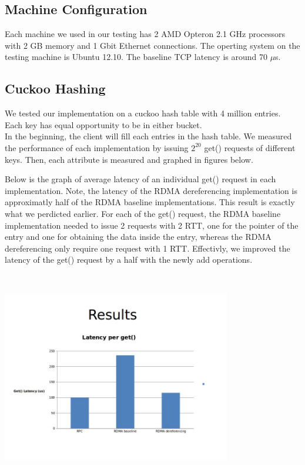 \documentclass[a4paper, oneside, 10pt]{article}
\begin{document}
\subsection{Machine Configuration}
Each machine we used in our testing has 2 AMD Opteron 2.1 GHz processors with 2
GB memory and 1 Gbit Ethernet connections. The operting system on the testing
machine is Ubuntu 12.10. The baseline TCP latency is around 70 $\mu$s.

\subsection{Cuckoo Hashing}
We tested our implementation on a cuckoo hash table with 4 million entries. Each
key has equal opportunity to be in either bucket.\\

In the beginning, the client will fill each entries in the hash table. We
measured the performance of each implementation by issuing $2^{20}$ get()
requests of different keys. Then, each attribute is measured and graphed in
figures below.

Below is the graph of average latency of an individual get() request in each
implementation. Note, the latency of the RDMA dereferencing implementation is
approximatly half of the RDMA baseline implementations. This result is exactly
what we perdicted earlier. For each of the get() request, the RDMA baseline
implementation needed to issue 2 requests with 2 RTT, one for the pointer of the
entry and one for obtaining the data inside the entry, whereas the RDMA
dereferencing only require one request with 1 RTT. Effectivly, we improved the
latency of the get() request by a half with the newly add operations.\\

\includegraphics[width=10cm,height=10cm,keepaspectratio]{latency.jpg}
\end{document}
